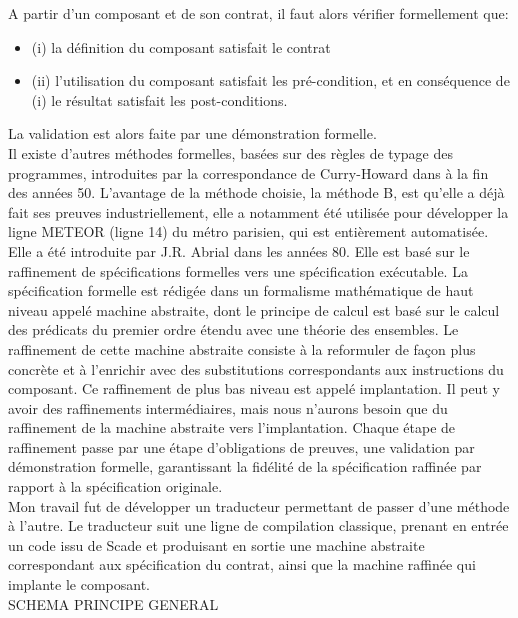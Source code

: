 A partir d'un composant et de son contrat, il faut alors vérifier formellement
que:
\begin{itemize}
\item  (i) la définition du composant satisfait le contrat
\item (ii) l'utilisation du composant satisfait les pré-condition, et en
conséquence de (i) le résultat satisfait les post-conditions.
\end{itemize}
La validation est alors faite par une démonstration formelle.\\

Il existe d'autres méthodes formelles, basées sur des règles de typage
des programmes, introduites par la correspondance de
Curry-Howard dans à la fin des années 50.
L'avantage de la méthode choisie, la méthode B, est qu'elle a déjà
fait ses preuves industriellement, elle a notamment été utilisée pour
développer la ligne METEOR (ligne 14) du métro parisien, qui est
entièrement automatisée.\\ 
Elle a été introduite
par J.R. Abrial dans les années 80. Elle est basé sur le raffinement de
spécifications formelles vers une spécification exécutable. La spécification
formelle est rédigée dans un formalisme mathématique de haut niveau appelé
machine abstraite, dont le principe de calcul est basé sur le calcul
des prédicats du premier ordre étendu avec une théorie des
ensembles. Le raffinement de cette machine abstraite consiste à la
reformuler de façon plus concrète et à l'enrichir avec des
substitutions correspondants aux instructions du composant. Ce
raffinement de plus bas niveau est appelé implantation. Il peut y
avoir des raffinements intermédiaires, mais nous n'aurons besoin que
du raffinement de la machine abstraite vers l'implantation. Chaque
étape de raffinement passe par une étape d'obligations de preuves, une
validation par démonstration formelle, garantissant la fidélité de la
spécification raffinée par rapport à la spécification originale. \\ 

Mon travail fut de développer un traducteur permettant de passer d'une méthode à
l'autre. Le traducteur suit une ligne de compilation classique, prenant en
entrée un code issu de Scade et produisant en sortie une machine abstraite
correspondant aux spécification du contrat, ainsi que la machine raffinée qui
implante le composant. \\

SCHEMA PRINCIPE GENERAL

